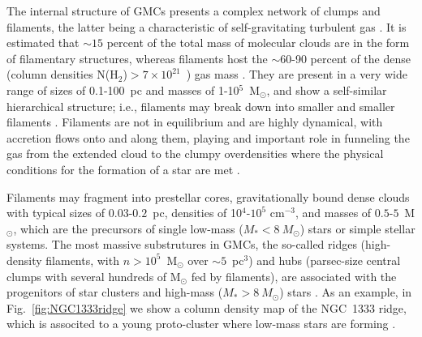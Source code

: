 \documentclass[12pt]{mythesis}
\begin{document}
The internal structure of GMCs presents a complex network of clumps and filaments, the latter being a characteristic of self-gravitating turbulent gas \citep{andre2014}. It is estimated that $\sim15$ percent of the total mass of molecular clouds are in the form of filamentary structures, whereas filaments host the $\sim$60-90 percent of the dense (column densities N(H$_2$)$>7\times10^{21}$~\cmsq) gas mass \citep{pineda2023}.
They are present in a very wide range of sizes of 0.1-100~pc and masses of 1-10$^5$~M$_\odot$, and show a self-similar hierarchical structure; i.e., filaments may break down into smaller and smaller filaments \citep{vazquez-semadeni2019,hacar2023}. %
Filaments are not in equilibrium and are highly dynamical, with accretion flows onto and along them, playing and important role in funneling the gas from the extended cloud to the clumpy overdensities where the physical conditions for the formation of a star are met \citep[e.g.][]{gomez2014}. 

Filaments may fragment into prestellar cores, gravitationally bound dense clouds with typical sizes of $0.03$-$0.2$~pc, densities of 10$^4$-$10^5$ cm$^{-3}$, and masses of $0.5$-$5$~M$_\odot$, which are 
 the precursors
of single low-mass ($M_*<8~M_\odot$) stars or simple stellar systems. 
The most massive substrutures in GMCs, the so-called ridges (high-density filaments, with $n>10^5$~M$_\odot$ over $\sim5$~pc$^3$) and hubs (parsec-size central clumps with several hundreds of M$_\odot$ fed by filaments), are associated with the progenitors of star clusters and high-mass ($M_*>8~M_\odot$) stars \citep{motte2018}. As an example, in Fig.~\ref{fig:NGC1333ridge} we show a column density map of the NGC~1333 ridge, which is associted to a young proto-cluster where low-mass stars are forming \citep{hacar2017}.
\end{document}
